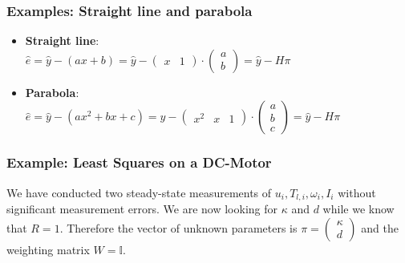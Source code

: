 \documentclass[10pt,a4paper]{scrartcl}
\begin{document}
\begin{multicols*}{3}

\subsubsection{Examples: Straight line and parabola}
\begin{itemize}
\item \textbf{Straight line}:\\
$\hat{e}=\hat{y}-(ax+b)=\hat{y}- \begin{pmatrix} x&1 \end{pmatrix} \cdot \begin{pmatrix} a\\ b\end{pmatrix}=\hat{y}-H\pi$
\item \textbf{Parabola}:\\
$\hat{e}=\hat{y}-(ax^2+bx+c)=\hat{y}- \begin{pmatrix} x^2&x&1 \end{pmatrix} \cdot \begin{pmatrix} a\\ b \\ c\end{pmatrix}=\hat{y}-H\pi$
\end{itemize}

\subsubsection{Example: Least Squares on a DC-Motor}
We have conducted two steady-state measurements of $u_i,T_{l,i},\omega_i,I_i$ without significant measurement errors.
We are now looking for $\kappa$ and $d$ while we know that $R=1$.
Therefore the vector of unknown parameters is $\pi=\begin{pmatrix} \kappa \\d\end{pmatrix}$ and the weighting matrix $W=\mathbb{I}$.\\


\end{multicols*}
\end{document}
